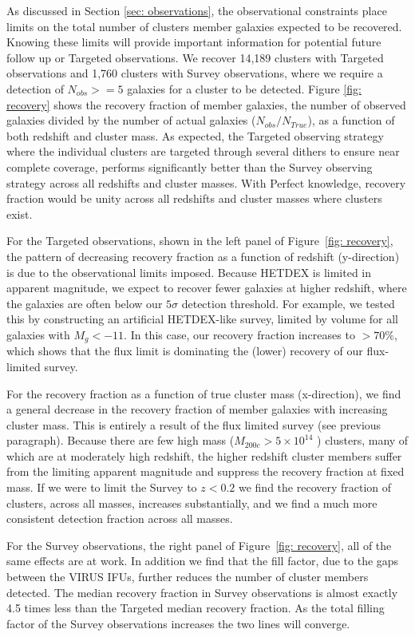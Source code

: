 \documentclass[fleqn,usenatbib]{mnras}
\begin{document}
As discussed in Section \ref{sec: observations}, the observational constraints place limits on the total number of clusters member galaxies expected to be recovered. Knowing these limits will provide important information for potential future follow up or Targeted observations. We recover 14,189 clusters with Targeted observations and 1,760 clusters with Survey observations, where we require a detection of $N_{obs} >=5$ galaxies for a cluster to be detected. Figure \ref{fig: recovery} shows the recovery fraction of member galaxies, the number of observed galaxies divided by the number of actual galaxies ($N_{obs}/N_{True}$), as a function of both redshift and cluster mass. As expected, the Targeted observing strategy where the individual clusters are targeted through several dithers to ensure near complete coverage, performs significantly better than the Survey observing strategy across all redshifts and cluster masses. With Perfect knowledge, recovery fraction would be unity across all redshifts and cluster masses where clusters exist.

For the Targeted observations, shown in the left panel of Figure~\ref{fig: recovery}, the pattern of decreasing recovery fraction as a function of redshift (y-direction) is due to the observational limits imposed. Because HETDEX is limited in apparent magnitude, we expect to recover fewer galaxies at higher redshift, where the galaxies are often below our $5\sigma$ detection threshold. For example, we tested this by constructing an artificial HETDEX-like survey, limited by volume for all galaxies with $M_g < -11$. In this case, our recovery fraction increases to $>70$\%, which shows that the flux limit is dominating the (lower) recovery of our flux-limited survey.

For the recovery fraction as a function of true cluster mass (x-direction), we find a general decrease in the recovery fraction of member galaxies with increasing cluster mass. This  is entirely a result of the flux limited survey (see previous paragraph). Because there are few high mass ($M_{200c}>5\times10^{14}$ \Msol) clusters, many of which are at moderately high redshift, the higher redshift cluster members suffer from the limiting apparent magnitude and suppress the recovery fraction at fixed mass. If we were to limit the Survey to $z<0.2$ we find the recovery fraction of clusters, across all masses, increases substantially, and we find a much more consistent detection fraction across all masses. 

For the Survey observations, the right panel of Figure~\ref{fig: recovery}, all of the same effects are at work. In addition we find that the fill factor, due to the gaps between the VIRUS IFUs, further reduces the number of cluster members detected. The median recovery fraction in Survey observations is almost exactly 4.5 times less than the Targeted median recovery fraction. As the total filling factor of the Survey observations increases the two lines will converge.
\end{document}
